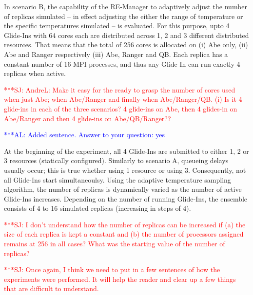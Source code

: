 \documentclass{rspublic}
\newcommand{\alnote}[1]{ {\textcolor{blue} { ***AL: #1 }}}
\newcommand{\jhanote}[1]{ {\textcolor{red} { ***SJ: #1 }}}
\newcommand{\alnote}[1]{}
\newcommand{\jhanote}[1]{}
\begin{document}
In scenario B, the capability of the RE-Manager to adaptively adjust
the number of replicas simulated -- in effect adjusting the either the
range of temperature or the specific temperatures simulated -- is
evaluated. For this purpose, upto 4 Glide-Ins with 64 cores each are
distributed across 1, 2 and 3 different distributed resources. That
means that the total of 256 cores is allocated on (i) Abe only, (ii)
Abe and Ranger respectively (iii) Abe, Ranger and QB.  Each replica
has a constant number of 16 MPI processes, and thus any Glide-In can
run exactly 4 replicas when active.

\jhanote{AndreL: Make it easy for the ready to grasp the number of
  cores used when just Abe; when Abe/Ranger and finally when
  Abe/Ranger/QB. (i) Is it 4 glide-ins in each of the three scenarios?
  4 glide-ins on Abe, then 4 glides-in on Abe/Ranger and then 4
  glide-ins on Abe/QB/Ranger??}

\alnote{Added sentence. Answer to your question: yes}
              
At the beginning of the experiment, all 4 Glide-Ins are submitted to
either 1, 2 or 3 resources (statically configured).  Similarly to
scenario A, queueing delays usually occur; this is true whether using
1 resource or using 3.  Consequently, not all Glide-Ins start
simultaneoulsy.  Using the adaptive temperature sampling algorithm,
the number of replicas is dynamically varied as the number of active
Glide-Ins increases. Depending on the number of running Glide-Ins, the
ensemble consists of 4 to 16 simulated replicas (increasing in steps
of 4).

\jhanote{I don't understand how the number of replicas can be
  increased if (a) the size of each replica is kept a constant and (b)
  the number of processors assigned remains at 256 in all cases? What
  was the starting value of the number of replicas?}  

\jhanote{Once again, I think we need to put in a few sentences of how
  the experiments were performed. It will help the reader and clear up
  a few things that are difficult to understand.}
\end{document}

